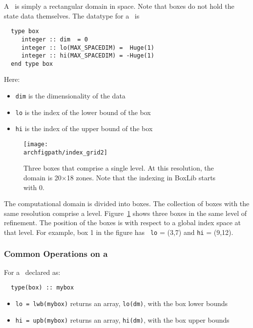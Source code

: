 A \boxtype\ is simply a rectangular domain in space.  Note that boxes
do not hold the state data themselves.  The datatype for a
\boxtype\ is
\begin{verbatim}
  type box
     integer :: dim  = 0
     integer :: lo(MAX_SPACEDIM) =  Huge(1)
     integer :: hi(MAX_SPACEDIM) = -Huge(1)
  end type box
\end{verbatim}

\noindent Here:
\begin{itemize}
\item {\tt dim} is the dimensionality of the data
\item {\tt lo} is the index of the lower bound of the box
\item {\tt hi} is the index of the upper bound of the box
\end{itemize}


\begin{figure}[h]
\centering
\texttt{[image: \\archfigpath/index\_grid2]}
\caption[Single-level grid structure]
{\label{fig:boxes} Three boxes that comprise a single level.  At this
  resolution, the domain is 20$\times$18 zones.  Note that the
  indexing in BoxLib starts with $0$.}
\end{figure}


The computational domain is divided into boxes.  The collection of
boxes with the same resolution comprise a level.
Figure~\ref{fig:boxes} shows three boxes in the same level of
refinement.  The position of the boxes is with respect to a global
index space at that level.  For example, box 1 in the figure has {\tt
  lo} = (3,7) and {\tt hi} = (9,12).


\subsubsection{Common Operations on a \boxtype}

For a \boxtype\ declared as:
\begin{verbatim}
  type(box) :: mybox
\end{verbatim}

\begin{itemize}

\item {\tt lo = lwb(mybox)} returns an array, {\tt lo(dm)}, with
     the box lower bounds

\item {\tt hi = upb(mybox)} returns an array, {\tt hi(dm)}, with
     the box upper bounds

\end{itemize}



